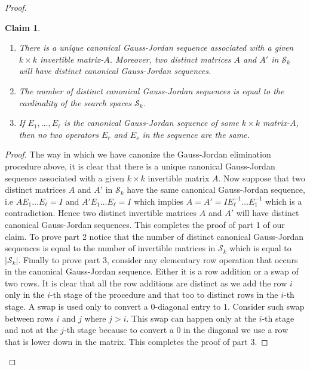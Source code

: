 \documentclass{sig-alternate-2013}
\newtheorem{claim}{Claim}[theorem]
\begin{document}
\begin{proof}
  \begin{claim}\label{claim-gauss-jordan}
    \begin{enumerate}
    \item There is a unique canonical Gauss-Jordan sequence associated
      with a given $k\times k$ invertible matrix-$A$. Moreover, two
      distinct matrices $A$ and $A'$ in $\mathcal{S}_k$ will have
      distinct canonical Gauss-Jordan sequences.
    \item The number of distinct canonical Gauss-Jordan sequences is
      equal to the cardinality of the search spaces $\mathcal{S}_k$.
    \item If $E_1,\ldots,E_\ell$ is the canonical Gauss-Jordan
      sequence of some $k\times k$ matrix-$A$, then no two operators
      $E_r$ and $E_s$ in the sequence are the same.
    \end{enumerate}
  \end{claim}
   \begin{proof}
     The way in which we have canonize the Gauss-Jordan elimination
     procedure above, it is clear that there is a unique canonical
     Gauss-Jordan sequence associated with a given $k \times k$
     invertible matrix $A$. Now suppose that two distinct matrices $A$
     and $A'$ in $\mathcal{S}_k$ have the same canonical Gauss-Jordan
     sequence, i.e $AE_1 \ldots E_\ell=I$ and $A'E_1 \ldots E_\ell=I$
     which implies $A=A'=IE_{\ell}^{-1}\ldots E_1^{-1}$ which is a
     contradiction. Hence two distinct invertible matrices $A$ and
     $A'$ will have distinct canonical Gauss-Jordan sequences.  This
     completes the proof of part 1 of our claim. To prove part 2
     notice that the number of distinct canonical Gauss-Jordan
     sequences is equal to the number of invertible matrices in
     $\mathcal{S}_k$ which is equal to $|\mathcal{S}_k|$.  Finally to
     prove part 3, consider any elementary row operation that occurs
     in the canonical Gauss-Jordan sequence. Either it is a row
     addition or a swap of two rows. It is clear that all the row
     additions are distinct as we add the row $i$ only in the $i$-th
     stage of the procedure and that too to distinct rows in the
     $i$-th stage. A swap is used only to convert a $0$-diagonal entry
     to $1$. Consider such swap between rows $i$ and $j$ where $j >
     i$. This swap can happen only at the $i$-th stage and not at the
     $j$-th stage because to convert a $0$ in the diagonal we use a
     row that is lower down in the matrix. This completes the proof of
     part 3.
   \end{proof}


\end{proof}
\end{document}
